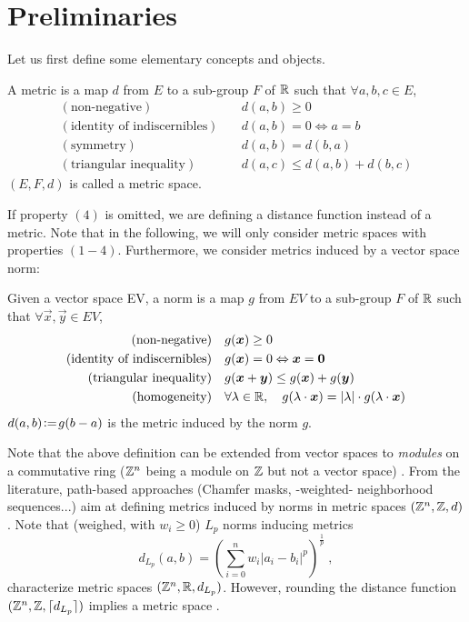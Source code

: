 \documentclass{llncs}
\begin{document}
\section{Preliminaries}
\label{sec:preliminaries}
Let us first define some elementary concepts and objects.
\begin{definition}
  \label{def:distance}
  A metric is a map $d$ from $E$ to a sub-group $F$ of ${\mathbb{R}}$ such that
  $\forall a,b,c\in E$,
  \begin{align}
    (\text{non-negative})\quad & d(a,b)\geq 0\\
    (\text{identity of indiscernibles}) \quad&  d(a,b)= 0
    \Leftrightarrow a=b\\
    (\text{symmetry})\quad &  d(a,b)=d(b,a)\\
    (\text{triangular inequality})\quad &   d(a,c) \leq d(a,b) + d(b,c)
  \end{align}
$(E, F, d)$ is called a metric space.
\end{definition}
If property $(4)$ is omitted, we are defining a distance function
instead of a metric. Note that in the following, we will only consider
metric spaces with properties $(1-4)$. Furthermore, we
consider  metrics induced by a vector space norm:
\begin{definition}
  \label{def:distance}
  Given a vector space EV, a norm is a map $g$ from  $EV$ to a sub-group
  $F$ of ${\mathbb{R}}$ such that $\forall \vec{x},\vec{y}\in EV$,
  \begin{align}
    (\text{non-negative})\quad & g(\vec{x})\geq 0\\
    (\text{identity of indiscernibles}) \quad&  g(\vec{x})= 0
    \Leftrightarrow \vec{x}=\vec{0}\\
    (\text{triangular inequality})\quad &   g(\vec{x}+\vec{y}) \leq
    g(\vec{x}) + g(\vec{y})\\
    (\text{homogeneity})\quad &  \forall \lambda\in\R, \quad
    g(\lambda\cdot\vec{x}) = |\lambda|\cdot g(\lambda\cdot\vec{x})
  \end{align}
$d(a,b) \!\mathrel{\mathop:}=\! g(b-a)$ is the metric induced by the
  norm $g$.
\end{definition}
Note that the above definition can be extended from vector spaces to
\emph{modules} on a commutative ring (${\mathbb{Z}}^n$ being a module on ${\mathbb{Z}}$
but not a vector space) \cite{Thiel_hdr}.
From the literature, path-based approaches (Chamfer masks, -weighted-
neighborhood sequences...)  aim at defining metrics induced by norms
in metric spaces $({\mathbb{Z}}^n, {\mathbb{Z}} , d)$.  Note that (weighed, with $w_i\geq 0$) $L_p$ norms inducing
metrics
\begin{equation}
    d_{L_p} (a,b) = \left ( \sum_{i=0}^n w_i|a_i-b_i |^p \right )^{\frac{1}{p}}\;,
  \end{equation}
characterize metric spaces $({\mathbb{Z}}^n, {\mathbb{R}} , d_{L_p})$. However,
rounding the distance function $({\mathbb{Z}}^n,{\mathbb{Z}}, \lceil d_{L_p}\rceil)$ implies a
metric space \cite{klette_book}.
\end{document}
